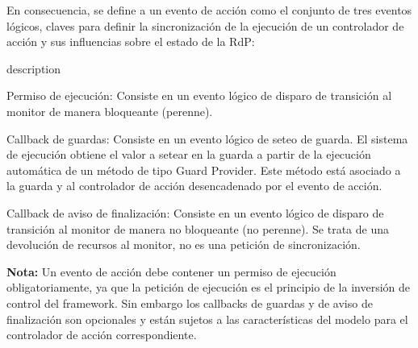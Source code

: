 En consecuencia, se define a un evento de acción como el conjunto de tres
eventos lógicos, claves para definir la sincronización de la ejecución de un
controlador de acción y sus influencias sobre el estado de la RdP:
\begin{labeling}{description}
  \item [Permiso de ejecución: ] Consiste en un evento lógico de disparo
  de transición al monitor de manera bloqueante (perenne).
  \item [Callback de guardas: ] Consiste en un evento lógico de seteo de
  guarda. El sistema de ejecución obtiene el valor a setear en la guarda a
  partir de la ejecución automática de un método de tipo Guard Provider. Este
  método está asociado a la guarda y al controlador de acción desencadenado por
  el evento de acción.
  \item [Callback de aviso de finalización: ]
  Consiste en un evento lógico de disparo de transición al monitor de manera no
  bloqueante (no perenne). Se trata de una devolución de recursos al monitor,
  no es una petición de sincronización.
\end{labeling}

\begin{framed}
\textbf{Nota:} Un evento de acción debe contener un permiso de ejecución
obligatoriamente, ya que la petición de ejecución es el principio de la
inversión de control del framework. Sin embargo los callbacks de guardas y de
aviso de finalización son opcionales y están sujetos a las características del
modelo para el controlador de acción correspondiente.
\end{framed}

